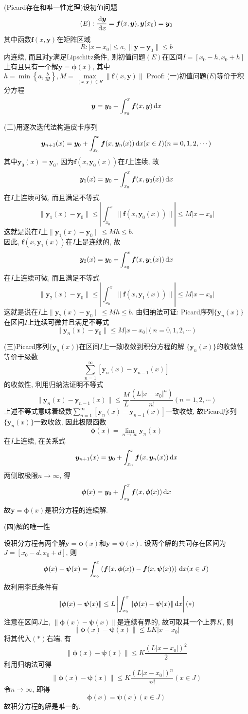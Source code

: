 \begin{solve}
(Picard存在和唯一性定理)设初值问题
\[(E):\frac{\,\mathrm{d}\bm{y}}{\,\mathrm{d} x}=\bm{f}(x,\bm{y}),\bm{y}(x_0)=\bm{y}_0\]
其中函数$\bm{f}(x,\bm{y})$在矩阵区域\[R:|x-x_0|\leq a,\|\bm{y}-\bm{y}_0\|\leq b\]
内连续, 而且对$\bm{y}$满足Lipschitz条件, 则初值问题$(E)$在区间$I=[x_0-h,x_0+h]$上有且只有一个解$\bm{y}=\bm{\phi}(x)$, 
其中$\displaystyle h=\min\left\{a,\frac{b}{M}\right\},M=\max\limits_{(x,\bm{y})\in R}\|\bm{f}(x,\bm{y})\|$
Proof:
(一)初值问题($E$)等价于积分方程
\[\bm{y}=\bm{y}_0+\int_{x_0}^x\bm{f}(x,\bm{y})\,\mathrm{d} x\]

(二)用逐次迭代法构造皮卡序列
\[\bm{y}_{n+1}(x)=\bm{y}_0+\int_{x_0}^x\bm{f}(x,\bm{y}_n(x))\,\mathrm{d} x(x\in I)(n=0,1,2,\cdots)\]
其中$\bm{y}_0(x)=\bm{y}_0$, 因为$\bm{f}(x,\bm{y}_0(x))$在$I$上连续, 故
\[\bm{y}_1(x)=\bm{y}_0+\int_{x_0}^x\bm{f}(x,\bm{y}_0(x))\,\mathrm{d} x\]
在$I$上连续可微, 而且满足不等式
\[\|\bm{y}_1(x)-\bm{y}_0\|\leq\left|\int_{x_0}^x\|\bm{f}(x,\bm{y}_0(x))\|\right|\leq M|x-x_0|\]
这就是说在$I$上$\|\bm{y}_1(x)-\bm{y}_0\|\leq Mh\leq b$.\\
因此, $\bm{f}(x,\bm{y}_1(x))$在$I$上是连续的, 故
\[\bm{y}_2(x)=\bm{y}_0+\int_{x_0}^x\bm{f}(x,\bm{y}_1(x))\,\mathrm{d} x\]
在$I$上连续可微, 而且满足不等式
\[\|\bm{y}_2(x)-\bm{y}_0\|\leq\left|\int_{x_0}^x\|\bm{f}(x,\bm{y}_1(x))\|\right|\leq M|x-x_0|\]
这就是说在$I$上$\|\bm{y}_2(x)-\bm{y}_0\|\leq Mh\leq b$.
由归纳法可证: Picard序列$\{\bm{y}_n(x)\}$在区间$I$上连续可微并且满足不等式
\[\|\bm{y}_n(x)-\bm{y}_0\|\leq M|x-x_0|(n=0,1,2,\cdots)\]

(三)Picard序列$\{\bm{y}_n(x)\}$在区间$I$上一致收敛到积分方程的解
$\{\bm{y}_n(x)\}$的收敛性等价于级数
\[\sum_{n=1}^{\infty}[\bm{y}_{n}(x)-\bm{y}_{n-1}(x)]\]
的收敛性, 利用归纳法证明不等式
\[\|\bm{y}_n(x)-\bm{y}_{n-1}(x)\|\leq\frac{M}{L}\frac{(L|x-x_0|^n)}{n!}(n=1,2,\cdots)\]
上述不等式意味着级数$\sum\limits_{n=1}^{\infty}[\bm{y}_{n}(x)-\bm{y}_{n-1}(x)]$一致收敛, 故Picard序列$\{\bm{y}_n(x)\}$一致收敛, 因此极限函数
\[\bm{\phi}(x)=\lim_{n\to\infty}\bm{y}_n(x)\]
在$I$上连续, 在关系式
\[\bm{y}_{n+1}(x)=\bm{y}_0+\int_{x_0}^x\bm{f}(x,\bm{y}_n(x))\,\mathrm{d} x\]
两侧取极限$n\to\infty$, 得
\[\bm{\phi}(x)=\bm{y}_0+\int_{x_0}^x\bm{f}(x,\bm{\phi}(x))\,\mathrm{d} x\]
故$\bm{y}=\bm{\phi}(x)$是积分方程的连续解.

(四)解的唯一性

设积分方程有两个解$\bm{y}=\bm{\phi}(x)$和$\bm{y}=\bm{\psi}(x)$. 设两个解的共同存在区间为$J=[x_0-d,x_0+d]$, 则
\[\bm{\phi}(x)-\bm{\psi}(x)=\int_{x_0}^x\left(\bm{f}(x,\bm{\phi}(x))-\bm{f}(x,\bm{\psi}(x))\right)\,\mathrm{d} x(x\in J)\]
故利用李氏条件有\[\|\bm{\phi}(x)-\bm{\psi}(x)\|\leq L\left|\int_{x_0}^x\|\bm{\phi}(x)-\bm{\psi}(x)\|\,\mathrm{d} x\right|(*)\]
注意在区间$J$上, $\|\bm{\phi}(x)-\bm{\psi}(x)\|$是连续有界的, 故可取其一个上界$K$, 则
\[\|\bm{\phi}(x)-\bm{\psi}(x)\|\leq LK|x-x_0|\]
将其代入$(*)$右端, 有
\[\|\bm{\phi}(x)-\bm{\psi}(x)\|\leq K\frac{(L|x-x_0|)^2}{2}\]
利用归纳法可得
\[\|\bm{\phi}(x)-\bm{\psi}(x)\|\leq K\frac{(L|x-x_0|)^n}{n!}(x\in J)\]
令$n\to\infty$, 即得\[\bm{\phi}(x)=\bm{\psi}(x)(x\in J)\]
故积分方程的解是唯一的.
\end{solve}


